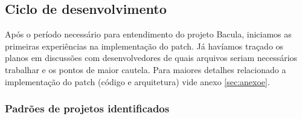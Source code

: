 % 
% 
% 
%  
% 
% 
%  
% 
% 
% 
% 
%  
% 

\subsection{Ciclo de desenvolvimento}

Após o período necessário para entendimento do projeto Bacula, iniciamos as primeiras experiências na implementação do patch. Já havíamos traçado os planos em discussões com desenvolvedores de quais arquivos seriam necessários trabalhar e os pontos de maior cautela. Para maiores detalhes relacionado a implementação do patch (código e arquitetura) vide anexo \ref{sec:anexoe}.

\subsubsection{Padrões de projetos identificados}

